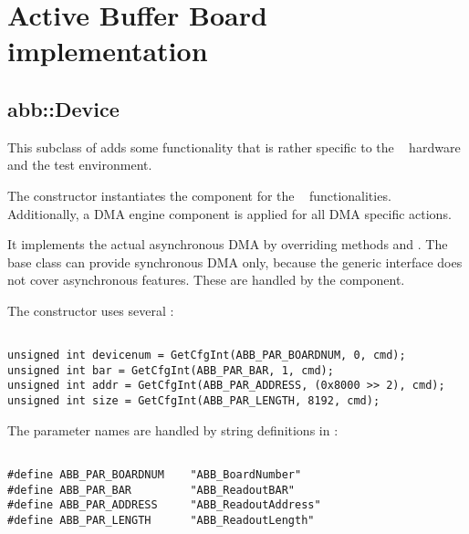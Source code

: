 \section{Active Buffer Board implementation}
\subsection{abb::Device}
This subclass of  adds some functionality that is
rather specific to the \ABB~ hardware and the test environment.


\begin{compactenum} 

\item The constructor instantiates the  component for the
\ABB~ functionalities. Additionally, a DMA engine component
 is applied for all DMA specific actions.

\item It implements the actual asynchronous DMA by overriding 
methods  and .
The base class 
can provide synchronous DMA only, because
the generic  interface 
does not cover asynchronous features.
These are handled by the  component.

\item  The constructor uses several :

\begin{small} 
\begin{verbatim} 

unsigned int devicenum = GetCfgInt(ABB_PAR_BOARDNUM, 0, cmd);
unsigned int bar = GetCfgInt(ABB_PAR_BAR, 1, cmd);
unsigned int addr = GetCfgInt(ABB_PAR_ADDRESS, (0x8000 >> 2), cmd);
unsigned int size = GetCfgInt(ABB_PAR_LENGTH, 8192, cmd);

\end{verbatim}
\end{small} 


The parameter names are handled by string definitions in :

\begin{small} 
\begin{verbatim}

#define ABB_PAR_BOARDNUM    "ABB_BoardNumber"
#define ABB_PAR_BAR         "ABB_ReadoutBAR"
#define ABB_PAR_ADDRESS     "ABB_ReadoutAddress"
#define ABB_PAR_LENGTH      "ABB_ReadoutLength"


\end{verbatim}
\end{small}
\end{compactenum}
